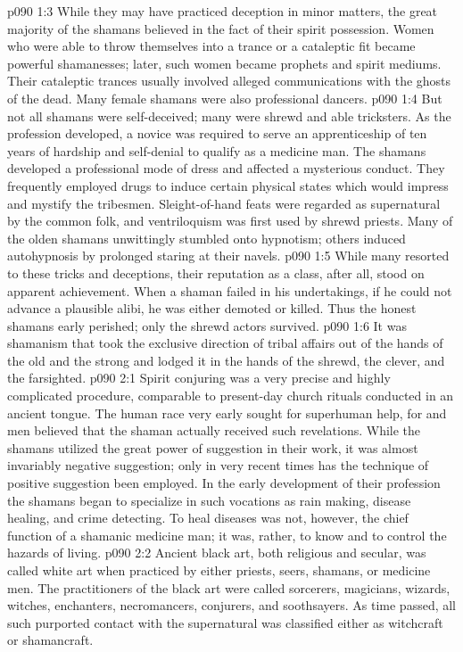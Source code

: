 \vs p090 1:3 While they may have practiced deception in minor matters, the great majority of the shamans believed in the fact of their spirit possession. Women who were able to throw themselves into a trance or a cataleptic fit became powerful shamanesses; later, such women became prophets and spirit mediums. Their cataleptic trances usually involved alleged communications with the ghosts of the dead. Many female shamans were also professional dancers.
\vs p090 1:4 But not all shamans were self\hyp{}deceived; many were shrewd and able tricksters. As the profession developed, a novice was required to serve an apprenticeship of ten years of hardship and self\hyp{}denial to qualify as a medicine man. The shamans developed a professional mode of dress and affected a mysterious conduct. They frequently employed drugs to induce certain physical states which would impress and mystify the tribesmen. Sleight\hyp{}of\hyp{}hand feats were regarded as supernatural by the common folk, and ventriloquism was first used by shrewd priests. Many of the olden shamans unwittingly stumbled onto hypnotism; others induced autohypnosis by prolonged staring at their navels.\plusone
\vs p090 1:5 While many resorted to these tricks and deceptions, their reputation as a class, after all, stood on apparent achievement. When a shaman failed in his undertakings, if he could not advance a plausible alibi, he was either demoted or killed. Thus the honest shamans early perished; only the shrewd actors survived.
\vs p090 1:6 It was shamanism that took the exclusive direction of tribal affairs out of the hands of the old and the strong and lodged it in the hands of the shrewd, the clever, and the farsighted.
\vs p090 2:1 Spirit conjuring was a very precise and highly complicated procedure, comparable to present\hyp{}day church rituals conducted in an ancient tongue. The human race very early sought for superhuman help, for  and men believed that the shaman actually received such revelations. While the shamans utilized the great power of suggestion in their work, it was almost invariably negative suggestion; only in very recent times has the technique of positive suggestion been employed. In the early development of their profession the shamans began to specialize in such vocations as rain making, disease healing, and crime detecting. To heal diseases was not, however, the chief function of a shamanic medicine man; it was, rather, to know and to control the hazards of living.
\vs p090 2:2 Ancient black art, both religious and secular, was called white art when practiced by either priests, seers, shamans, or medicine men. The practitioners of the black art were called sorcerers, magicians, wizards, witches, enchanters, necromancers, conjurers, and soothsayers. As time passed, all such purported contact with the supernatural was classified either as witchcraft or shamancraft.
